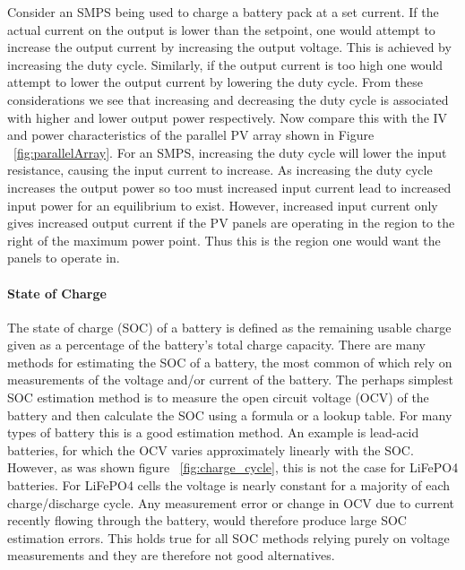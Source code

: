 \documentclass[a4paper]{article}
\begin{document}
Consider an SMPS being used to charge a battery pack at a set current. If 
the actual current on the output is lower than the setpoint, one would 
attempt to increase the output current by increasing the output voltage. 
This is achieved by increasing the duty cycle. Similarly, if the output 
current is too high one would attempt to lower the output current by 
lowering the duty cycle. From these considerations we see that increasing 
and decreasing the duty cycle is associated with higher and lower output power 
respectively. Now compare this with the IV and power characteristics of the 
parallel PV array shown in Figure ~\ref{fig:parallelArray}. For an SMPS, 
increasing the duty cycle will lower the input resistance, causing the input 
current to increase. As increasing the duty cycle increases the output 
power so too must increased input current lead to increased input power for 
an equilibrium to exist. However, increased input current only gives increased 
output current if the PV panels are operating in the region to the right of the 
maximum power point. Thus this is the region one would want the panels to operate in. 

\paragraph*{State of Charge}
The state of charge (SOC) of a battery is defined as the remaining usable charge 
given as a percentage of the battery’s total charge capacity\cite{DICKINSON2009452}. There are many 
methods for  estimating the SOC of a battery, the most common of which rely on 
measurements of the voltage and/or current of the battery\cite{DANKO2019186}. The perhaps 
simplest SOC estimation method is to measure the open circuit voltage (OCV) 
of the battery and then calculate the SOC using a formula or a lookup table. 
For many types of battery this is a good estimation method. An example is 
lead-acid batteries, for which the OCV varies approximately linearly with the 
SOC. However, as was shown figure ~\ref{fig:charge_cycle}, this is not the case 
for LiFePO4 batteries. For LiFePO4 cells the voltage is nearly constant for 
a majority of each charge/discharge cycle. Any measurement error or change in 
OCV due to current recently flowing through the battery, would therefore produce large 
SOC estimation errors. This holds true for all SOC methods relying purely on 
voltage measurements and they are therefore not good alternatives. 
\end{document}
